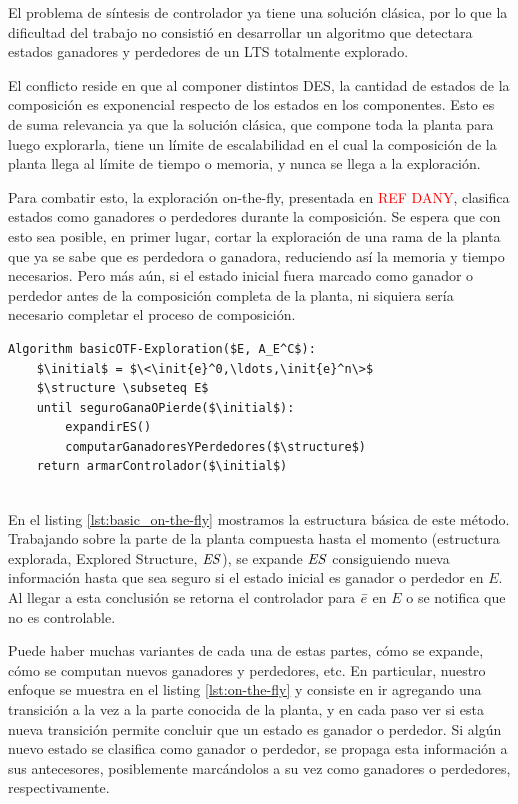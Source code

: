 El problema de síntesis de controlador ya tiene una solución clásica, por lo que la dificultad del trabajo no consistió en desarrollar un algoritmo que detectara estados ganadores y perdedores de un LTS totalmente explorado. 

El conflicto reside en que al componer distintos DES, la cantidad de estados de la composición es exponencial respecto de los estados en los componentes. Esto es de suma relevancia ya que la solución clásica, que compone toda la planta para luego explorarla, tiene un límite de escalabilidad en el cual la composición de la planta llega al límite de tiempo o memoria, y nunca se llega a la exploración.

Para combatir esto, la exploración on-the-fly, presentada en \textcolor{red}{REF DANY}, clasifica estados como ganadores o perdedores durante la composición. Se espera que con esto sea posible, en primer lugar, cortar la exploración de una rama de la planta que ya se sabe que es perdedora o ganadora, reduciendo así la memoria y tiempo necesarios. Pero más aún, si el estado inicial fuera marcado como ganador o perdedor antes de la composición completa de la planta, ni siquiera sería necesario completar el proceso de composición.

\begin{lstlisting}[language={pseudocode},label={lst:basic_on-the-fly},caption={Algoritmo on-the-fly básico},float=ht]
Algorithm basicOTF-Exploration($E, A_E^C$):
    $\initial$ = $\<\init{e}^0,\ldots,\init{e}^n\>$
    $\structure \subseteq E$
    until seguroGanaOPierde($\initial$):
        expandirES()
        computarGanadoresYPerdedores($\structure$)
    return armarControlador($\initial$)
        
\end{lstlisting}

En el listing \ref{lst:basic_on-the-fly} mostramos la estructura básica de este método. Trabajando sobre la parte de la planta compuesta hasta el momento (estructura explorada, Explored Structure, $\mathit{ES}$), se expande $\mathit{ES}$ consiguiendo nueva información hasta que sea seguro si el estado inicial es ganador o perdedor en $E$. Al llegar a esta conclusión se retorna el controlador para $\bar{e}$ en $E$ o se notifica que no es controlable.

Puede haber muchas variantes de cada una de estas partes, cómo se expande, cómo se computan nuevos ganadores y perdedores, etc. En particular, nuestro enfoque se muestra en el listing \ref{lst:on-the-fly} y consiste en ir agregando una transición a la vez a la parte conocida de la planta, y en cada paso ver si esta nueva transición permite concluir que un estado es ganador o perdedor. Si algún nuevo estado se clasifica como ganador  o perdedor, se propaga esta información a sus antecesores, posiblemente marcándolos a su vez como ganadores o perdedores, respectivamente.

